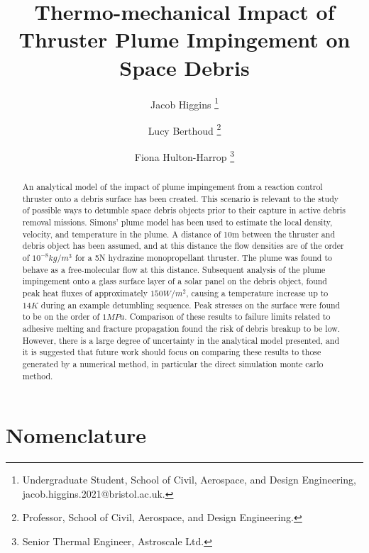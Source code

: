 \documentclass[journal]{new-aiaa}
\title{Thermo-mechanical Impact of Thruster Plume Impingement on Space Debris}
\author{Jacob Higgins \footnote{Undergraduate Student, School of Civil, Aerospace, and Design Engineering, jacob.higgins.2021@bristol.ac.uk.}}
\author{Lucy Berthoud \footnote{Professor, School of Civil, Aerospace, and Design Engineering.}}
\affil{University of Bristol Queen's Building, BS8 2TR, United Kingdom}
\author{Fiona Hulton-Harrop \footnote{Senior Thermal Engineer, Astroscale Ltd.}}
\affil{Astroscale Ltd.,Zeus Rutherford Avenue, Harwell Campus, Didcot, Oxfordshire, England, OX11 0DF}
\begin{document}










\maketitle

\begin{abstract}

An analytical model of the impact of plume impingement from a reaction control thruster onto a debris surface has been created. This scenario is relevant to the study of possible ways to detumble space debris objects prior to their capture in active debris removal missions. Simons' plume model has been used to estimate the local density, velocity, and temperature in the plume. A distance of 10m between the thruster and debris object has been assumed, and at this distance the flow densities are of the order of $10^{-8}kg/m^3$ for a 5N hydrazine monopropellant thruster. The plume was found to behave as a free-molecular flow at this distance. Subsequent analysis of the plume impingement onto a glass surface layer of a solar panel on the debris object, found peak heat fluxes of approximately $150W/m^2$, causing a temperature increase up to $14K$ during an example detumbling sequence. Peak stresses on the surface were found to be on the order of $1MPa$. Comparison of these results to failure limits related to adhesive melting and fracture propagation found the risk of debris breakup to be low. However, there is a large degree of uncertainty in the analytical model presented, and it is suggested that future work should focus on comparing these results to those generated by a numerical method, in particular the direct simulation monte carlo method.

\end{abstract}

\section*{Nomenclature}
\end{document}
